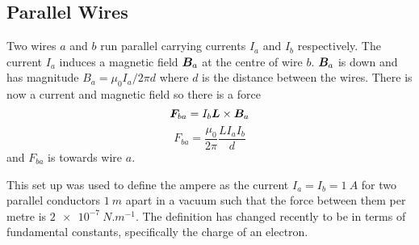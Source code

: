 \documentclass{article}
\begin{document}
    \subsection{Parallel Wires}
    Two wires \(a\) and \(b\) run parallel carrying currents \(I_a\) and \(I_b\) respectively.
    The current \(I_a\) induces a magnetic field \(\bm{B}_a\) at the centre of wire \(b\).
    \(\bm{B}_a\) is down and has magnitude \(B_a = \mu_0 I_a/2\pi d\) where \(d\) is the distance between the wires.
    There is now a current and magnetic field so there is a force
    \[\bm{F}_{ba} = I_b\bm{L}\times\bm{B}_a\]
    \[F_{ba} = \frac{\mu_0}{2\pi}\frac{LI_aI_b}{d}\]
    and \(F_{ba}\) is towards wire \(a\).
    
    This set up was used to define the ampere as the current \(I_a = I_b = \SI{1}{A}\) for two parallel conductors \(\SI{1}{m}\) apart in a vacuum such that the force between them per metre is \(\SI{2e-7}{N.m^{-1}}\).
    The definition has changed recently to be in terms of fundamental constants, specifically the charge of an electron.
    
\end{document}

